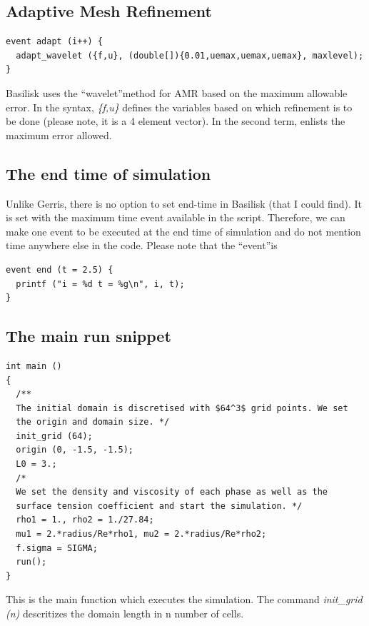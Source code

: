 \documentclass[]{article}
\begin{document}
\subsection{Adaptive Mesh Refinement}
\begin{verbatim}
event adapt (i++) {
  adapt_wavelet ({f,u}, (double[]){0.01,uemax,uemax,uemax}, maxlevel);
}
\end{verbatim}
Basilisk uses the \textquotedblleft wavelet\textquotedblright method for AMR based on the maximum allowable error. In the syntax, \textit{\{f,u\}} defines the variables based on which refinement is to be done (please note, it is a 4 element vector). In the second term,  enlists the maximum error allowed. 
\subsection{The end time of simulation}
Unlike Gerris, there is no option to set end-time in Basilisk (that I could find). It is set with the maximum time event available in the script. Therefore, we can make one event to be executed at the end time of simulation and do not mention time anywhere else in the code. Please note that the \textquotedblleft event\textquotedblright is 
\begin{verbatim}
event end (t = 2.5) {
  printf ("i = %d t = %g\n", i, t);
}
\end{verbatim}
\subsection{The main run snippet}
\begin{verbatim}
int main ()
{
  /**
  The initial domain is discretised with $64^3$ grid points. We set
  the origin and domain size. */
  init_grid (64);
  origin (0, -1.5, -1.5);
  L0 = 3.;
  /*
  We set the density and viscosity of each phase as well as the
  surface tension coefficient and start the simulation. */
  rho1 = 1., rho2 = 1./27.84;
  mu1 = 2.*radius/Re*rho1, mu2 = 2.*radius/Re*rho2;
  f.sigma = SIGMA;
  run();
}
\end{verbatim}
This is the main function which executes the simulation. The command \textit{init\_grid (n)} descritizes the domain length in n number of cells. \\
\end{document}
